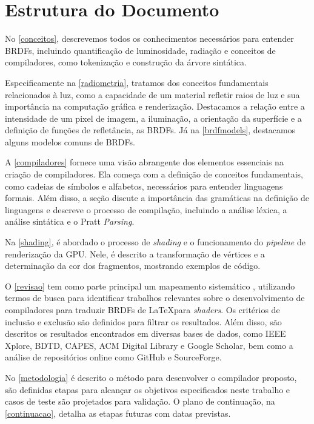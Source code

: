 \documentclass[english, 
               brazil, 
               bsc] %
               {dcomp-abntex2}
\begin{document}
\section{Estrutura do Documento}
No \autoref{conceitos}, descrevemos todos os conhecimentos necessários para entender BRDFs, incluindo quantificação de luminosidade, radiação e  conceitos de compiladores, como tokenização e construção da árvore sintática.

Especificamente na \autoref{radiometria}, tratamos dos conceitos fundamentais relacionados à luz, como a capacidade de um material refletir raios de luz e sua importância na computação gráfica e renderização. Destacamos a relação entre a intensidade de um pixel de imagem, a iluminação, a orientação da superfície e  a definição de funções de refletância, as BRDFs. 
Já na \autoref{brdfmodels}, destacamos alguns modelos comuns de BRDFs.  

A \autoref{compiladores} fornece uma visão abrangente dos elementos essenciais na criação de compiladores. Ela começa com a definição de conceitos fundamentais, como cadeias de símbolos e alfabetos, necessários para entender linguagens formais. Além disso, a seção discute a importância das gramáticas na definição de linguagens e descreve o processo de compilação, incluindo a análise léxica, a análise sintática e o Pratt \textit{Parsing}.

Na \autoref{shading}, é abordado o processo de \textit{shading} e o funcionamento do \textit{pipeline} de renderização da GPU. Nele, é descrito a transformação de vértices e a determinação da cor dos fragmentos, mostrando exemplos de código. 

O \autoref{revisao} tem como parte principal um mapeamento sistemático , utilizando termos de busca para identificar trabalhos relevantes sobre o desenvolvimento de compiladores para traduzir BRDFs de \LaTeX  para \textit{shaders}. Os critérios de inclusão e exclusão são definidos para filtrar os resultados. Além disso, são descritos os resultados encontrados em diversas bases de dados, como IEEE Xplore, BDTD, CAPES, ACM Digital Library e Google Scholar, bem como a análise de repositórios online como GitHub e SourceForge. 

No \autoref{metodologia} é descrito o método para desenvolver o compilador proposto, são definidas etapas para alcançar os objetivos especificados neste trabalho e casos de teste são projetados para validação. O plano de continuação, na \autoref{continuacao}, detalha as etapas futuras com datas previstas.
\end{document}
